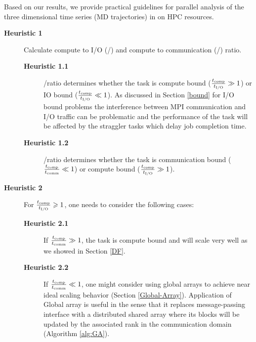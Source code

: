 \label{guideline}
Based on our results, we provide practical guidelines for parallel analysis of the three dimensional time series (MD trajectories) in  on HPC resources.

\begin{description}
  \item[\textbf{Heuristic 1}] Calculate compute to I/O (\tcomp/\tIO) and compute to communication (\tcomp/\tcomm) ratio. 
  \begin{description}
  \item[\textbf{Heuristic 1.1}] \tcomp/\tIO ratio determines whether the task is compute bound ($\frac{{t}_{\text{comp}}}{{t}_{\text{I/O}}} \gg 1$) or IO bound ($\frac{{t}_{\text{comp}}}{{t}_{\text{I/O}}} \ll 1$). 
  As discussed in Section \ref{bound} for I/O bound problems the interference between MPI communication and I/O traffic can be problematic \cite{VMD2013, Kevin2018} and the performance of the task will be affected by the straggler tasks which delay job completion time.  
  \item[\textbf{Heuristic 1.2}] \tcomp/\tcomm ratio determines whether the task is communication bound ($\frac{{t}_{\text{comp}}}{t_{\text{comm}}} \ll 1$) or compute bound ($\frac{{t}_{\text{comp}}}{{t}_{\text{I/O}}} \gg 1$).
  \end{description}
  
  \item[\textbf{Heuristic 2}] For $\frac{{t}_{\text{comp}}}{{t}_{\text{I/O}}} \geqslant 1$, one needs to consider the following cases: 
  \begin{description}
  \item[\textbf{Heuristic 2.1}] If $\frac{{t}_{\text{comp}}}{t_{\text{comm}}} \gg 1$, the task is compute bound and will scale very well as we showed in Section \ref{DF}.
  \item[\textbf{Heuristic 2.2}] If $\frac{{t}_{\text{comp}}}{t_{\text{comm}}} \ll 1$, one might consider using global arrays to achieve near ideal scaling behavior (Section \ref{Global-Array}). 
  Application of Global array is useful in the sense that it replaces message-passing interface with a distributed shared array where its 
  blocks will be updated by the associated rank in the communication domain (Algorithm \ref{alg:GA}). 
  \end{description}
  

\end{description}
